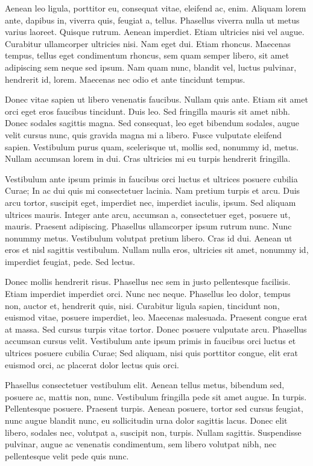 Aenean leo ligula, porttitor eu, consequat vitae, eleifend ac, enim. Aliquam
lorem ante, dapibus in, viverra quis, feugiat a, tellus. Phasellus viverra
nulla ut metus varius laoreet. Quisque rutrum. Aenean imperdiet. Etiam
ultricies nisi vel augue. Curabitur ullamcorper ultricies nisi. Nam eget dui.
Etiam rhoncus. Maecenas tempus, tellus eget condimentum rhoncus, sem quam
semper libero, sit amet adipiscing sem neque sed ipsum. Nam quam nunc, blandit
vel, luctus pulvinar, hendrerit id, lorem. Maecenas nec odio et ante tincidunt
tempus.

Donec vitae sapien ut libero venenatis faucibus. Nullam quis ante. Etiam sit
amet orci eget eros faucibus tincidunt. Duis leo. Sed fringilla mauris sit amet
nibh. Donec sodales sagittis magna. Sed consequat, leo eget bibendum sodales,
augue velit cursus nunc, quis gravida magna mi a libero. Fusce vulputate
eleifend sapien. Vestibulum purus quam, scelerisque ut, mollis sed, nonummy id,
metus. Nullam accumsan lorem in dui. Cras ultricies mi eu turpis hendrerit
fringilla.

Vestibulum ante ipsum primis in faucibus orci luctus et ultrices posuere
cubilia Curae; In ac dui quis mi consectetuer lacinia. Nam pretium turpis et
arcu. Duis arcu tortor, suscipit eget, imperdiet nec, imperdiet iaculis, ipsum.
Sed aliquam ultrices mauris. Integer ante arcu, accumsan a, consectetuer eget,
posuere ut, mauris. Praesent adipiscing. Phasellus ullamcorper ipsum rutrum
nunc. Nunc nonummy metus. Vestibulum volutpat pretium libero. Cras id dui.
Aenean ut eros et nisl sagittis vestibulum. Nullam nulla eros, ultricies sit
amet, nonummy id, imperdiet feugiat, pede. Sed lectus.

Donec mollis hendrerit risus. Phasellus nec sem in justo pellentesque
facilisis. Etiam imperdiet imperdiet orci. Nunc nec neque. Phasellus leo dolor,
tempus non, auctor et, hendrerit quis, nisi. Curabitur ligula sapien, tincidunt
non, euismod vitae, posuere imperdiet, leo. Maecenas malesuada. Praesent congue
erat at massa. Sed cursus turpis vitae tortor. Donec posuere vulputate arcu.
Phasellus accumsan cursus velit. Vestibulum ante ipsum primis in faucibus orci
luctus et ultrices posuere cubilia Curae; Sed aliquam, nisi quis porttitor
congue, elit erat euismod orci, ac placerat dolor lectus quis orci.

Phasellus consectetuer vestibulum elit. Aenean tellus metus, bibendum sed,
posuere ac, mattis non, nunc. Vestibulum fringilla pede sit amet augue. In
turpis. Pellentesque posuere. Praesent turpis. Aenean posuere, tortor sed
cursus feugiat, nunc augue blandit nunc, eu sollicitudin urna dolor sagittis
lacus. Donec elit libero, sodales nec, volutpat a, suscipit non, turpis. Nullam
sagittis. Suspendisse pulvinar, augue ac venenatis condimentum, sem libero
volutpat nibh, nec pellentesque velit pede quis nunc.

